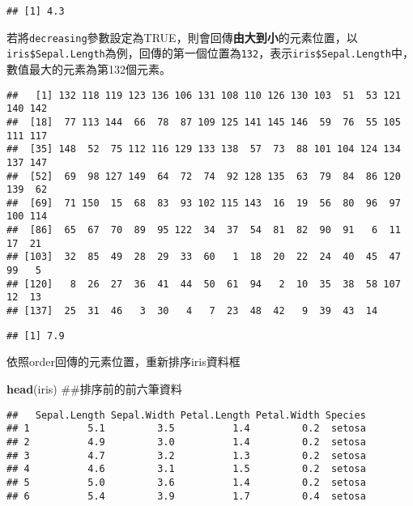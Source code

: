 \documentclass[]{book}
\newenvironment{Shaded}{\begin{snugshade}}{\end{snugshade}}
\newcommand{\KeywordTok}[1]{\textcolor[rgb]{0.13,0.29,0.53}{\textbf{{#1}}}}
\newcommand{\DataTypeTok}[1]{\textcolor[rgb]{0.13,0.29,0.53}{{#1}}}
\newcommand{\DecValTok}[1]{\textcolor[rgb]{0.00,0.00,0.81}{{#1}}}
\newcommand{\NormalTok}[1]{{#1}}
\begin{document}
\begin{verbatim}
## [1] 4.3
\end{verbatim}

若將\texttt{decreasing}參數設定為TRUE，則會回傳\textbf{由大到小}的元素位置，以\texttt{iris\$Sepal.Length}為例，回傳的第一個位置為\texttt{132}，表示\texttt{iris\$Sepal.Length}中，數值最大的元素為第132個元素。

\begin{Shaded}
\end{Shaded}

\begin{verbatim}
##   [1] 132 118 119 123 136 106 131 108 110 126 130 103  51  53 121 140 142
##  [18]  77 113 144  66  78  87 109 125 141 145 146  59  76  55 105 111 117
##  [35] 148  52  75 112 116 129 133 138  57  73  88 101 104 124 134 137 147
##  [52]  69  98 127 149  64  72  74  92 128 135  63  79  84  86 120 139  62
##  [69]  71 150  15  68  83  93 102 115 143  16  19  56  80  96  97 100 114
##  [86]  65  67  70  89  95 122  34  37  54  81  82  90  91   6  11  17  21
## [103]  32  85  49  28  29  33  60   1  18  20  22  24  40  45  47  99   5
## [120]   8  26  27  36  41  44  50  61  94   2  10  35  38  58 107  12  13
## [137]  25  31  46   3  30   4   7  23  48  42   9  39  43  14
\end{verbatim}

\begin{Shaded}
\end{Shaded}

\begin{verbatim}
## [1] 7.9
\end{verbatim}

依照order回傳的元素位置，重新排序iris資料框

\begin{Shaded}
\begin{Highlighting}[]
\KeywordTok{head}\NormalTok{(iris) ##排序前的前六筆資料}
\end{Highlighting}
\end{Shaded}

\begin{verbatim}
##   Sepal.Length Sepal.Width Petal.Length Petal.Width Species
## 1          5.1         3.5          1.4         0.2  setosa
## 2          4.9         3.0          1.4         0.2  setosa
## 3          4.7         3.2          1.3         0.2  setosa
## 4          4.6         3.1          1.5         0.2  setosa
## 5          5.0         3.6          1.4         0.2  setosa
## 6          5.4         3.9          1.7         0.4  setosa
\end{verbatim}
\end{document}
